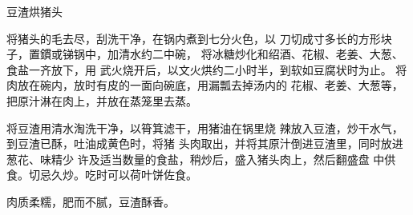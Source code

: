 \begin{recipe}{豆渣烘猪头}

\ingredients


\cooking

将猪头的毛去尽，刮洗干净，在锅内煮到七分火色，以 刀切成寸多长的方形块子，置鏆或锑锅中，加清水约二中碗， 将冰糖炒化和绍酒、花椒、老姜、大葱、食盐一齐放下，用 武火烧开后，以文火烘约二小时半，到软如豆腐状时为止。 将肉放在碗内，放时有皮的一面向碗底，用漏瓢去掉汤内的 花椒、老姜、大葱等，把原汁淋在肉上，并放在蒸笼里去蒸。

将豆渣用清水淘洗干净，以筲箕滤干，用猪油在锅里烧 辣放入豆渣，炒干水气，到豆渣已酥，吐油成黄色时，将猪 头肉取出，并将其原汁倒进豆渣里，同时放进葱花、味精少 许及适当数量的食盐，稍炒后，盛入猪头肉上，然后翻盛盘 中供食。切忌久炒。吃时可以荷叶饼佐食。

\notes

肉质柔糯，肥而不腻，豆渣酥香。

\end{recipe}

